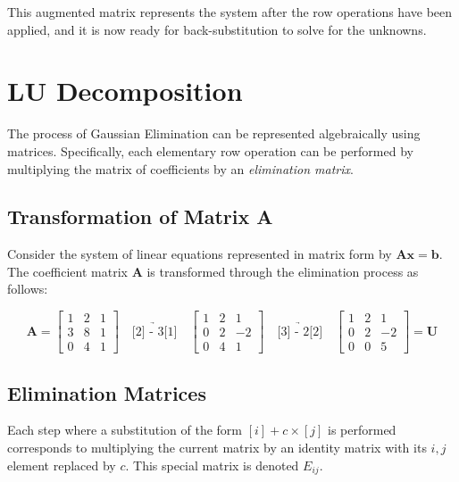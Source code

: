 This augmented matrix represents the system after the row operations have been applied, and it is now ready for back-substitution to solve for the unknowns.



\section{LU Decomposition}

The process of Gaussian Elimination can be represented algebraically using matrices. Specifically, each elementary row operation can be performed by multiplying the matrix of coefficients by an \textit{elimination matrix}.

\subsection*{Transformation of Matrix A}

Consider the system of linear equations represented in matrix form by \( \mathbf{A}\mathbf{x} = \mathbf{b} \). The coefficient matrix \( \mathbf{A} \) is transformed through the elimination process as follows:

\[
\mathbf{A} =
\begin{bmatrix}
    1 & 2 & 1 \\
    3 & 8 & 1 \\
    0 & 4 & 1
\end{bmatrix}
\quad \underrightarrow{\text{[2] - 3[1]}}
\quad
\begin{bmatrix}
    1 & 2 & 1 \\
    0 & 2 & -2 \\
    0 & 4 & 1
\end{bmatrix}
\quad \underrightarrow{\text{[3] - 2[2]}}
\quad
\begin{bmatrix}
    1 & 2 & 1 \\
    0 & 2 & -2 \\
    0 & 0 & 5
\end{bmatrix} = \mathbf{U}
\]

\subsection*{Elimination Matrices}

Each step where a substitution of the form \([i] + c \times [j]\) is performed corresponds to multiplying the current matrix by an identity matrix with its \(i,j\) element replaced by \(c\). This special matrix is denoted \(E_{ij}\).

